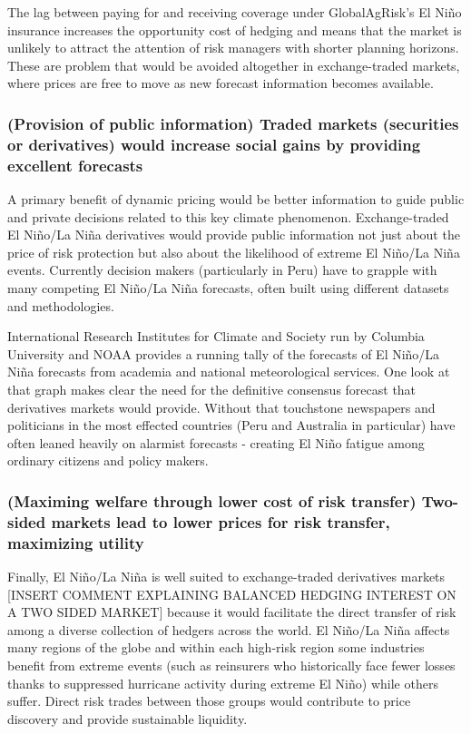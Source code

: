 \documentclass[authoryear]{article}
\begin{document}
The lag between paying for and receiving coverage under GlobalAgRisk’s El Ni\~no insurance increases the opportunity cost of hedging and means that the market is unlikely to attract the attention of risk managers with shorter planning horizons. These are problem that would be avoided altogether in exchange-traded markets, where prices are free to move as new forecast information becomes available.

\subsubsection{(Provision of public information) Traded markets (securities or derivatives) would increase social gains by providing excellent forecasts} 

A primary benefit of dynamic pricing would be better information to guide public and private decisions related to this key climate phenomenon. Exchange-traded El Ni\~no/La Ni\~na derivatives would provide public information not just about the price of risk protection but also about the likelihood of extreme El Ni\~no/La Ni\~na events. Currently decision makers (particularly in Peru) have to grapple with many competing El Ni\~no/La Ni\~na forecasts, often built using different datasets and methodologies. 

International Research Institutes for Climate and Society run by Columbia University and NOAA provides a running tally of the forecasts of El Ni\~no/La Ni\~na forecasts from academia and national meteorological services. One look at that graph makes clear the need for the definitive consensus forecast that derivatives markets would provide. Without that touchstone newspapers and politicians in the most effected countries (Peru and Australia in particular) have often leaned heavily on alarmist forecasts - creating El Ni\~no fatigue among ordinary citizens and policy makers.

\subsubsection{(Maximing welfare through lower cost of risk transfer) Two-sided markets lead to lower prices for risk transfer, maximizing utility}
Finally, El Ni\~no/La Ni\~na is well suited to exchange-traded derivatives markets [INSERT COMMENT EXPLAINING BALANCED HEDGING INTEREST ON A TWO SIDED MARKET] because it would facilitate the direct transfer of risk among a diverse collection of hedgers across the world. El Ni\~no/La Ni\~na affects many regions of the globe and within each high-risk region some industries benefit from extreme events (such as reinsurers who historically face fewer losses thanks to suppressed hurricane activity during extreme El Ni\~no) while others suffer. Direct risk trades between those groups would contribute to price discovery and provide sustainable liquidity.
\end{document}

